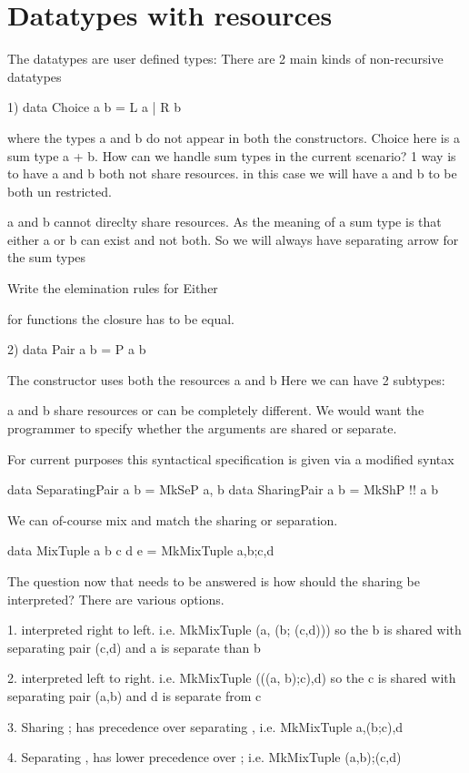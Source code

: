 \chapter{Datatypes with resources}

The datatypes are user defined types:
There are 2 main kinds of non-recursive datatypes

1) data Choice a b = L a | R b

where the types a and b do not appear in both the constructors.
Choice here is a sum type a + b. How can we handle sum types in the current scenario?
1 way is to have a and b both not share resources. in this case we will have
a and b to be both un restricted.

a and b cannot direclty share resources. As the meaning of a sum type is that
either a or b can exist and not both. So we will always have separating arrow
for the sum types

Write the elemination rules for Either

for functions the closure has to be equal.

2) data Pair a b = P a b

The constructor uses both the resources a and b
Here we can have 2 subtypes:

a and b share resources or can be completely different.
We would want the programmer to specify whether the arguments are shared or separate.

For current purposes this syntactical specification is given via a modified syntax

data SeparatingPair a b = MkSeP a, b
data SharingPair a b = MkShP !! a b

We can of-course mix and match the sharing or separation.

data MixTuple a b c d e = MkMixTuple a,b;c,d

The question now that needs to be answered is how should the sharing be interpreted?
There are various options.

1. interpreted right to left. i.e. MkMixTuple (a, (b; (c,d)))
   so the b is shared with separating pair (c,d) and a is separate than b

2. interpreted left to right. i.e. MkMixTuple (((a, b);c),d)
   so the c is shared with separating pair (a,b) and d is separate from c

3. Sharing ; has precedence over separating , i.e. MkMixTuple a,(b;c),d

4. Separating , has lower precedence over ; i.e. MkMixTuple (a,b);(c,d)

